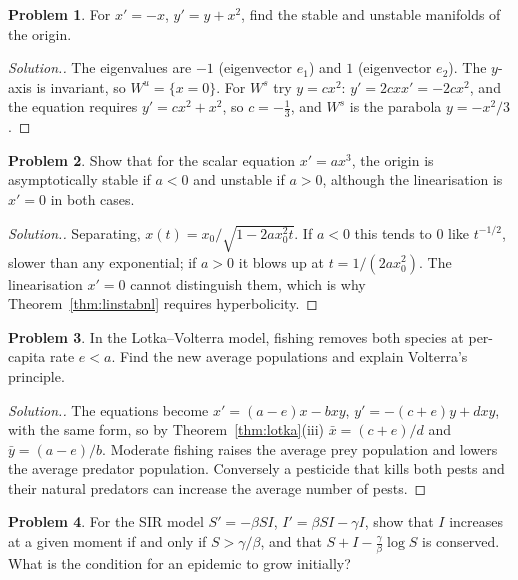 \documentclass[11pt,a4paper]{article}
\numberwithin{equation}{section}
\theoremstyle{definition}
\newtheorem{problemx}{Problem}[subsection]
\newenvironment{problem}{\begin{problemx}}{\end{problemx}}
\newenvironment{solution}
  {\renewcommand{\qedsymbol}{}\begin{proof}[\textit{Solution}.]}
  {\end{proof}}
\begin{document}
\begin{problem}
For $x' = -x$, $y' = y + x^2$, find the stable and unstable manifolds of the origin.
\end{problem}

\begin{solution}
The eigenvalues are $-1$ (eigenvector $e_1$) and $1$ (eigenvector $e_2$). The $y$-axis is invariant, so $W^u = \{x = 0\}$. For $W^s$ try $y = cx^2$: $y' = 2cxx' = -2cx^2$, and the equation requires $y' = cx^2 + x^2$, so
$c = -\frac13$, and $W^s$ is the parabola $y = -x^2/3$.
\end{solution}

\begin{problem}
Show that for the scalar equation $x' = ax^3$, the origin is asymptotically stable if $a < 0$ and unstable if $a > 0$, although the linearisation is $x' = 0$ in both cases.
\end{problem}

\begin{solution}
Separating, $x(t) = x_0/\sqrt{1 - 2ax_0^2t}$. If $a < 0$ this tends to $0$ like $t^{-1/2}$, slower than any exponential; if $a > 0$ it blows up at $t = 1/(2ax_0^2)$. The linearisation $x' = 0$ cannot distinguish them,
which is why Theorem~\ref{thm:linstabnl} requires hyperbolicity.
\end{solution}

\begin{problem}
In the Lotka--Volterra model, fishing removes both species at per-capita rate $e < a$. Find the new average populations and explain Volterra's principle.
\end{problem}

\begin{solution}
The equations become $x' = (a - e)x - bxy$, $y' = -(c + e)y + dxy$, with the same form, so by Theorem~\ref{thm:lotka}(iii) $\bar x = (c + e)/d$ and $\bar y = (a - e)/b$. Moderate fishing raises the average prey population and
lowers the average predator population. Conversely a pesticide that kills both pests and their natural predators can increase the average number of pests.
\end{solution}

\begin{problem}
For the SIR model $S' = -\beta SI$, $I' = \beta SI - \gamma I$, show that $I$ increases at a given moment if and only if $S > \gamma/\beta$, and that $S + I - \frac\gamma\beta\log S$ is conserved. What is the condition for an epidemic
to grow initially?
\end{problem}
\end{document}

